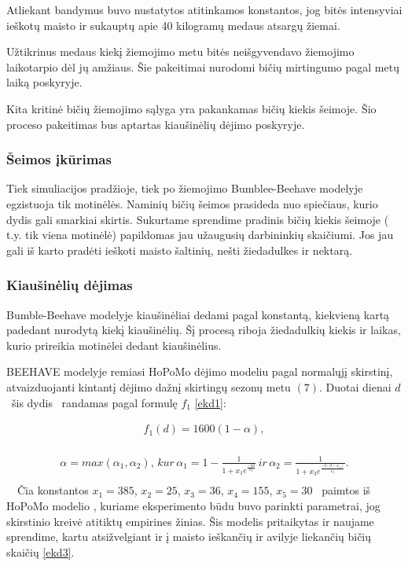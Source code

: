 \documentclass{VUMIFPSmagistrinis}
\begin{document}
Atliekant bandymus buvo nustatytos atitinkamos konstantos, jog bitės intensyviai ieškotų maisto ir sukauptų apie 40 kilogramų medaus atsargų žiemai.

Užtikrinus medaus kiekį žiemojimo metu bitės neišgyvendavo žiemojimo laikotarpio dėl jų amžiaus. Šie pakeitimai nurodomi bičių mirtingumo pagal metų laiką poskyryje.

Kita kritinė bičių žiemojimo sąlyga yra pakankamas bičių kiekis šeimoje. Šio proceso pakeitimas bus aptartas kiaušinėlių dėjimo poskyryje.


\subsubsection{Šeimos \k{i}k\=urimas}
Tiek simuliacijos pradžioje, tiek po žiemojimo Bumblee-Beehave modelyje egzistuoja tik motinėlės. Naminių bičių šeimos prasideda nuo spiečiaus, kurio dydis gali smarkiai skirtis. Sukurtame sprendime pradinis bičių kiekis šeimoje ( t.y. tik viena motinėlė) papildomas jau užaugusių darbininkių skaičiumi. Jos jau gali iš karto pradėti ieškoti maisto šaltinių, nešti žiedadulkes ir nektarą. 


\subsubsection{Kiau\v{s}in\.eli\k{u} d\.ejimas}
Bumble-Beehave modelyje kiaušinėliai dedami pagal konstantą, kiekvieną kartą padedant nurodytą kiekį kiaušinėlių. Šį procesą riboja žiedadulkių kiekis ir laikas, kurio prireikia motinėlei dedant kiaušinėlius.

BEEHAVE modelyje remiasi HoPoMo d\.ejimo modeliu pagal normal\k{u}j\k{i} skirstin\k{i}, atvaizduojanti kintant\k{i} d\.ejimo da\v{z}n\k{i} skirting\k{u} sezon\k{u} metu  $(7)$. Duotai dienai  $d$ \ \v{s}is dydis \ randamas pagal formul\k{e}  $f_1$ \eqref{ekd1}:

\begin{equation}
\label{ekd1}
\begin{matrix}f_1(d)=1600(1-\alpha ),\\\end{matrix}
\end{equation}

\bigskip

\begin{equation}
\label{ekd2}
\begin{matrix}\alpha =max(\alpha _{1},\alpha _{2}),\,kur\,\alpha _1=1-\frac 1{1+x_1e^{\frac{-2d}{x_2}}}\,ir\,\alpha _2=\frac 1{1+x_3e^{\frac{-2(d-x_4)}{x_3}}}.\\\end{matrix}
\end{equation}
\ \ \v{C}ia konstantos  $x_1=385$,  $x_2=25$,  $x_3=36$,  $x_4=155$,  $x_5=30$ \ paimtos i\v{s} HoPoMo modelio \cite{ScC07}, kuriame eksperimento b\=udu buvo parinkti parametrai, jog skirstinio kreiv\.e atitikt\k{u} empirines \v{z}inias. \v{S}is modelis pritaikytas ir naujame sprendime, kartu atsi\v{z}velgiant ir \k{i} maisto ie\v{s}kan\v{c}i\k{u} ir avilyje liekan\v{c}i\k{u} bi\v{c}i\k{u} skai\v{c}i\k{u} \eqref{ekd3}.
\end{document}
